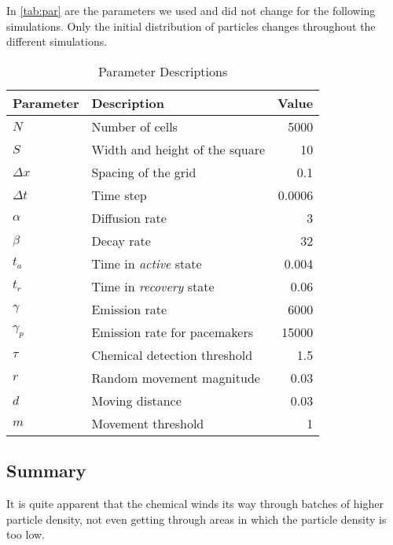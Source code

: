 \documentclass{class}
\begin{document}
In \autoref{tab:par} are the parameters we used and did not change for the following simulations.
Only the initial distribution of particles changes throughout the different simulations.
\begin{table}
    \centering
    \begin{tabular}{l|l|r}
        Parameter  & Description & Value\\\hline\hline
        $N$        & Number of cells & 5000\\\hline
        $S$        & Width and height of the square & 10\\\hline
        $\Delta x$ & Spacing of the grid & 0.1\\\hline
        $\Delta t$ & Time step & 0.0006\\\hline
        $\alpha$   & Diffusion rate & 3\\\hline
        $\beta$    & Decay rate & 32\\\hline
        $t_a$      & Time in \emph{active} state & 0.004\\\hline
        $t_r$      & Time in \emph{recovery} state & 0.06\\\hline
        $\gamma$   & Emission rate & 6000\\\hline
        $\gamma_p$ & Emission rate for pacemakers & 15000\\\hline
        $\tau$     & Chemical detection threshold & 1.5\\\hline
        $r$        & Random movement magnitude & 0.03\\\hline
        $d$        & Moving distance & 0.03\\\hline
        $m$        & Movement threshold & 1\\\hline
    \end{tabular}
    \caption{Parameter Descriptions}
    \label{tab:par}
\end{table}










\subsection{Summary}

It is quite apparent that the chemical winds its way through batches of higher particle density, not even getting through areas in which the particle density is too low.
\end{document}
